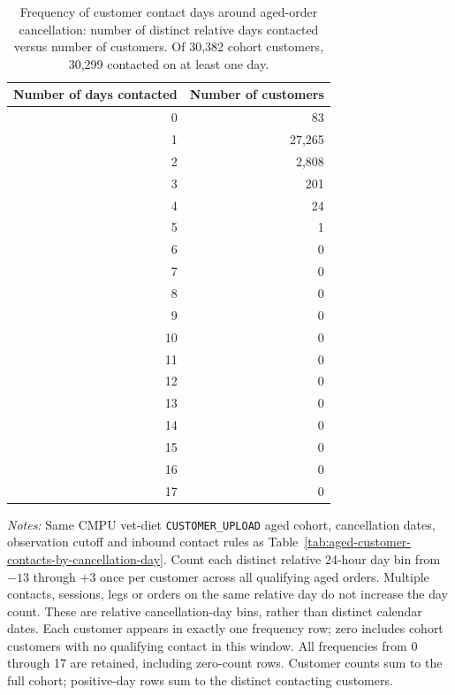 \begin{table}[!htbp]
\centering
\caption{Frequency of customer contact days around aged-order cancellation: number of distinct relative days contacted versus number of customers. Of 30,382 cohort customers, 30,299 contacted on at least one day.}
\label{tab:aged-customer-contact-day-frequency}
\begin{tabular}{@{}rr@{}}
\toprule
Number of days contacted & Number of customers \\
\midrule

0 & 83 \\

1 & 27,265 \\

2 & 2,808 \\

3 & 201 \\

4 & 24 \\

5 & 1 \\

6 & 0 \\

7 & 0 \\

8 & 0 \\

9 & 0 \\

10 & 0 \\

11 & 0 \\

12 & 0 \\

13 & 0 \\

14 & 0 \\

15 & 0 \\

16 & 0 \\

17 & 0 \\
\bottomrule
\end{tabular}

\begin{minipage}{\linewidth}
\footnotesize
\textit{Notes:} Same CMPU vet-diet \texttt{CUSTOMER\_UPLOAD} aged cohort,
cancellation dates, observation cutoff and inbound contact rules as
Table~\ref{tab:aged-customer-contacts-by-cancellation-day}.
Count each distinct relative 24-hour day bin from $-13$ through $+3$ once
per customer across all qualifying aged orders. Multiple contacts, sessions,
legs or orders on the same relative day do not increase the day count.
These are relative cancellation-day bins, rather than distinct calendar dates.
Each customer appears in exactly one frequency row; zero includes cohort
customers with no qualifying contact in this window. All frequencies from
0 through 17 are retained, including zero-count rows. Customer counts sum to
the full cohort; positive-day rows sum to the distinct contacting customers.
\end{minipage}
\end{table}